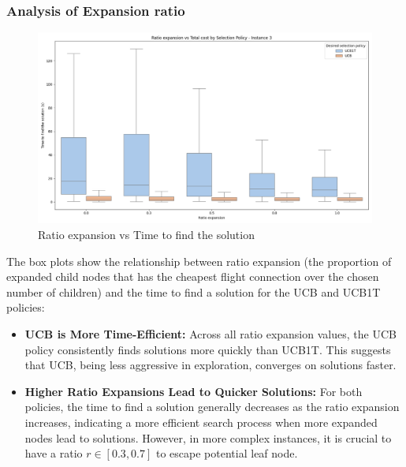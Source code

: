 \subsubsection*{Analysis of Expansion ratio}

\begin{figure}[!ht]
    \centering
    \includegraphics[width=\textwidth]{Figures/3 - ratio_vs_time.png}
    \caption{Ratio expansion vs Time to find the solution}
    \label{fig:Ratio vs Time}
\end{figure}

The box plots show the relationship between ratio expansion (the proportion of expanded child nodes that has the cheapest flight connection over the chosen number of children) and the time to find a solution for the UCB and UCB1T policies:

\begin{itemize}
    \item \textbf{UCB is More Time-Efficient:}
          Across all ratio expansion values, the UCB policy consistently finds solutions more quickly than UCB1T. This suggests that UCB, being less aggressive in exploration, converges on solutions faster.


    \item \textbf{Higher Ratio Expansions Lead to Quicker Solutions:}
          For both policies, the time to find a solution generally decreases as the ratio expansion increases, indicating a more efficient search process when more expanded nodes lead to solutions. However, in more complex instances, it is crucial to have a ratio $r \in [0.3,0.7]$ to escape potential leaf node.
\end{itemize}

